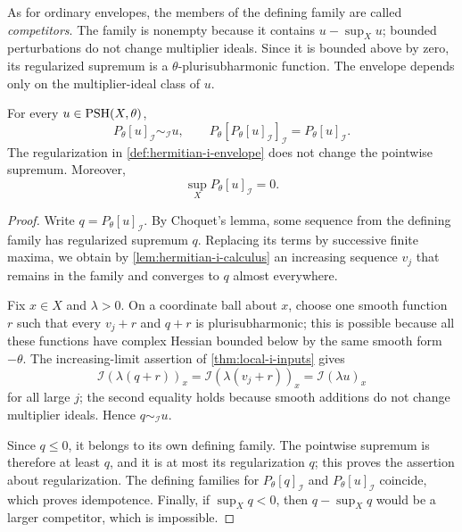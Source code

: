 As for ordinary envelopes, the members of the defining family are called \emph{competitors}. The family is nonempty because it contains $u-\sup_Xu$; bounded perturbations do not change multiplier ideals. Since it is bounded above by zero, its regularized supremum is a $\theta$-plurisubharmonic function. The envelope depends only on the multiplier-ideal class of $u$.

\begin{theorem}\label{thm:hermitian-i-projection}
For every $u\in\mathrm{PSH}(X,\theta)$,
\[
 P_\theta[u]_{\mathcal I}\sim_{\mathcal I}u,\qquad
 P_\theta[P_\theta[u]_{\mathcal I}]_{\mathcal I}=P_\theta[u]_{\mathcal I}.
\]
The regularization in \cref{def:hermitian-i-envelope} does not change the pointwise supremum. Moreover,
\[
 \sup_X P_\theta[u]_{\mathcal I}=0.
\]
\end{theorem}
\begin{proof}
Write $q=P_\theta[u]_{\mathcal I}$. By Choquet's lemma, some sequence from the defining family has regularized supremum $q$. Replacing its terms by successive finite maxima, we obtain by \cref{lem:hermitian-i-calculus} an increasing sequence $v_j$ that remains in the family and converges to $q$ almost everywhere.

Fix $x\in X$ and $\lambda>0$. On a coordinate ball about $x$, choose one smooth function $r$ such that every $v_j+r$ and $q+r$ is plurisubharmonic; this is possible because all these functions have complex Hessian bounded below by the same smooth form $-\theta$. The increasing-limit assertion of \cref{thm:local-i-inputs} gives
\[
 \mathcal I(\lambda(q+r))_x
   =\mathcal I(\lambda(v_j+r))_x
   =\mathcal I(\lambda u)_x
\]
for all large $j$; the second equality holds because smooth additions do not change multiplier ideals. Hence $q\sim_{\mathcal I}u$.

Since $q\leq0$, it belongs to its own defining family. The pointwise supremum is therefore at least $q$, and it is at most its regularization $q$; this proves the assertion about regularization. The defining families for $P_\theta[q]_{\mathcal I}$ and $P_\theta[u]_{\mathcal I}$ coincide, which proves idempotence. Finally, if $\sup_Xq<0$, then $q-\sup_Xq$ would be a larger competitor, which is impossible.
\end{proof}



